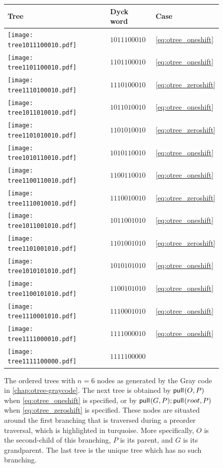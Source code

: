 \begin{figure}[ht]
\begin{minipage}[t]{0.335\linewidth}
\begin{tabular}{| m{2.3em} m{5em} m{} |} \hline
Tree & Dyck word & Case \\ \hline
\texttt{[image: tree1011100010.pdf]} & $1011100010$ & \eqref{eq:otree_oneshift}  \\ \hline
\texttt{[image: tree1101100010.pdf]} & $1101100010$ & \eqref{eq:otree_oneshift}  \\ \hline
\texttt{[image: tree1110100010.pdf]} & $1110100010$ & \eqref{eq:otree_zeroshift} \\ \hline
\texttt{[image: tree1011010010.pdf]} & $1011010010$ & \eqref{eq:otree_oneshift}  \\ \hline
\texttt{[image: tree1101010010.pdf]} & $1101010010$ & \eqref{eq:otree_zeroshift} \\ \hline
\texttt{[image: tree1010110010.pdf]} & $1010110010$ & \eqref{eq:otree_oneshift}  \\ \hline
\texttt{[image: tree1100110010.pdf]} & $1100110010$ & \eqref{eq:otree_oneshift}  \\ \hline
\texttt{[image: tree1110010010.pdf]} & $1110010010$ & \eqref{eq:otree_zeroshift} \\ \hline
\texttt{[image: tree1011001010.pdf]} & $1011001010$ & \eqref{eq:otree_oneshift}  \\ \hline
\texttt{[image: tree1101001010.pdf]} & $1101001010$ & \eqref{eq:otree_zeroshift} \\ \hline
\texttt{[image: tree1010101010.pdf]} & $1010101010$ & \eqref{eq:otree_oneshift}  \\ \hline
\texttt{[image: tree1100101010.pdf]} & $1100101010$ & \eqref{eq:otree_oneshift}  \\ \hline
\texttt{[image: tree1110001010.pdf]} & $1110001010$ & \eqref{eq:otree_oneshift}  \\ \hline
\texttt{[image: tree1111000010.pdf]} & $1111000010$ & \eqref{eq:otree_oneshift}  \\ \hline
\texttt{[image: tree1111100000.pdf]} & $1111100000$ &                            \\ \hline
\end{tabular}
\end{minipage}
    \caption[The ordered trees with $n = 6$ nodes as generated by the Gray code in \ref{chap:otree-graycode}.]{The ordered trees with $n = 6$ nodes as generated by the Gray code in \ref{chap:otree-graycode}.
    The next tree is obtained by $\mathsf{pull}_{}({O},{P})$ when \eqref{eq:otree_oneshift} is specified, or by $\mathsf{pull}_{}(G,P);\mathsf{pull}_{}({root},{P})$ when \eqref{eq:otree_zeroshift} is specified.
These nodes are situated around the first branching that is traversed during a preorder traversal, which is highlighted in turquoise.
More specifically, ${O}$ is the second-child of this branching, ${P}$ is its parent, and ${G}$ is its grandparent.
The last tree is the unique tree which has no such branching.}
\label{fig:trees6}
\end{figure}

